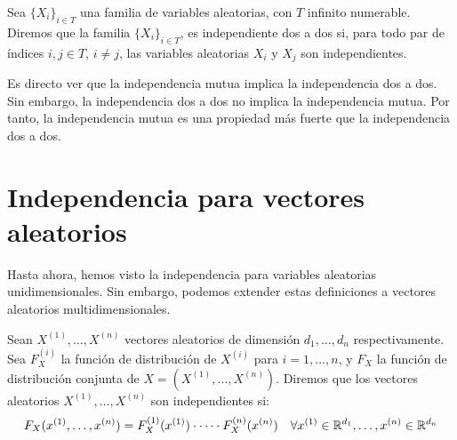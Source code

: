 \begin{definicion}
    Sea $\{X_i\}_{i\in T}$ una familia de variables aleatorias, con $T$ infinito numerable. Diremos que la familia $\{X_i\}_{i\in T}$, es independiente dos a dos si, para todo par de índices $i,j\in T$, $i\neq j$, las variables aleatorias $X_i$ y $X_j$ son independientes.
\end{definicion}

Es directo ver que la independencia mutua implica la independencia dos a dos. Sin embargo, la independencia dos a dos no implica la independencia mutua. Por tanto, la independencia mutua es una propiedad más fuerte que la independencia dos a dos.

\section{Independencia para vectores aleatorios}

Hasta ahora, hemos visto la independencia para variables aleatorias unidimensionales. Sin embargo, podemos extender estas definiciones a vectores aleatorios multidimensionales.
\begin{definicion}
    Sean $X^{(1)},\dots,X^{(n)}$ vectores aleatorios de dimensión $d_1,\dots,d_n$ respectivamente. Sea $F_X^{(i)}$ la función de distribución de $X^{(i)}$ para $i=1,\dots,n$, y $F_X$ la función de distribución conjunta de $X=(X^{(1)},\dots,X^{(n)})$. Diremos que los vectores aleatorios $X^{(1)},\dots,X^{(n)}$ son independientes si:
    \begin{equation*}
        F_X(x^{(1)},\dots,x^{(n)}) = F_X^{(1)}(x^{(1)})\cdot\dots\cdot F_X^{(n)}(x^{(n)}) \quad \forall x^{(1)}\in\mathbb{R}^{d_1},\dots,x^{(n)}\in\mathbb{R}^{d_n}
    \end{equation*}
\end{definicion}
